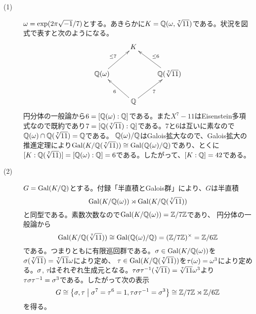 \begin{sol} ${}$
\begin{description}
  \item[(1)] ${\omega} = \exp (2\pi \sqrt{-1}/7)$とする。あきらかに$K = {\mathbb Q}({\omega}, \sqrt[7]{11})$である。状況を図式で表すと次のようになる。
  \[
  \xymatrix{& K &  \\  \Q(\gro) \ar[ur]^{\leq 7} & & \Q(\sqrt[7]{11}) \ar[ul]_{\leq 6} \\  &  \Q \ar[ul]^{6} \ar[ur]_{7} &
  }
  \]
  円分体の一般論から$6= [{\mathbb Q}({\omega}):{\mathbb Q}]$である。また$X^7 - 11$はEisenstein多項式なので既約であり$7=[{\mathbb Q}(\sqrt[7]{11}):{\mathbb Q}]$である。$7$と$6$は互いに素なので${\mathbb Q}({\omega}) \cap {\mathbb Q}(\sqrt[7]{11}) = {\mathbb Q}$である。
  ${\mathbb Q}({\omega}) / {\mathbb Q}$はGalois拡大なので、Galois拡大の推進定理により$\operatorname{Gal}(K/ {\mathbb Q}(\sqrt[7]{11})) \cong \operatorname{Gal}({\mathbb Q}({\omega}) / {\mathbb Q})$であり、とくに$[K: {\mathbb Q}(\sqrt[7]{11})] = [{\mathbb Q}({\omega}):{\mathbb Q}] = 6$である。したがって、$[K:{\mathbb Q}]=42$である。
  \item[(2)] $G = \operatorname{Gal}(K/ {\mathbb Q})$とする。付録「半直積とGalois群」により、$G$は半直積
  \[
\operatorname{Gal}(K/ {\mathbb Q}({\omega})) \rtimes \operatorname{Gal}(K/ {\mathbb Q}(\sqrt[7]{11}))
  \]
  と同型である。素数次数なので$\operatorname{Gal}(K/ {\mathbb Q}({\omega})) = {\mathbb Z} / 7 {\mathbb Z}$であり、
  円分体の一般論から
\[
\operatorname{Gal}(K/ {\mathbb Q}(\sqrt[7]{11})) \cong \operatorname{Gal}({\mathbb Q}({\omega}) / {\mathbb Q}) = ({\mathbb Z} / 7 {\mathbb Z})^{\times} = {\mathbb Z} / 6 {\mathbb Z}
\]
  である。つまりともに有限巡回群である。${\sigma} \in \operatorname{Gal}(K/ {\mathbb Q}({\omega}))$を${\sigma}(\sqrt[7]{11}) = \sqrt[7]{11} {\omega}$により定め、
  $\tau \in \operatorname{Gal}(K/ {\mathbb Q}(\sqrt[7]{11}))$を$\tau({\omega}) = {\omega}^3$により定める。${\sigma}$, $\tau$はそれぞれ生成元となる。$\tau {\sigma} \tau^{-1}(\sqrt[7]{11}) = \sqrt[7]{11} {\omega}^3$より
  $\tau {\sigma} \tau^{-1} = {\sigma}^3$である。したがって次の表示
  \[
  G \cong \left\{ {\sigma},\tau \mathrel{} \middle| \mathrel{} {\sigma}^7 = \tau^6 = 1, \tau {\sigma} \tau^{-1} = {\sigma}^3 \right\} \cong {\mathbb Z} / 7 {\mathbb Z} \rtimes {\mathbb Z} / 6 {\mathbb Z}
  \]
  を得る。


\end{description}
\end{sol}
